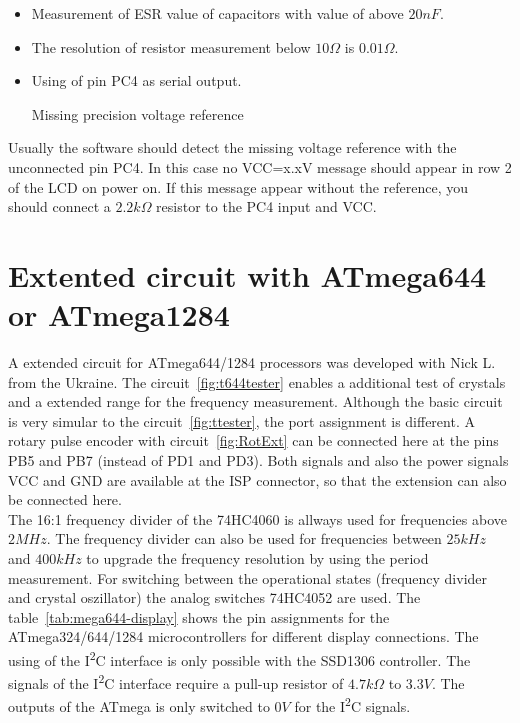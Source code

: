 \begin{description}
\begin{itemize}
 \item Measurement of ESR value of capacitors with value of above  \(20nF\).\\
 \item The resolution of resistor measurement below \(10\Omega\) is \(0.01\Omega\).\\
 \item Using of pin PC4 as serial output.\\
 \item[Missing precision voltage reference]
 \end{itemize}
Usually the software should detect the missing voltage reference with the unconnected pin PC4.
In this case no VCC=x.xV message should appear in row 2 of the LCD on power on.
If this message appear without the reference, you should connect a \(2.2k\Omega\) resistor
to the PC4 input and VCC.

\end{description}


\section{Extented circuit with ATmega644 or ATmega1284}

A extended circuit for ATmega644/1284 processors was developed with Nick L. from the Ukraine.
The circuit~\ref{fig:t644tester} enables a additional test of crystals and a extended range
for the frequency measurement.
Although the basic circuit is very simular to the circuit~\ref{fig:ttester}, the
port assignment is different.
A rotary pulse encoder with circuit~\ref{fig:RotExt} can be connected here at the pins PB5 and PB7 (instead of PD1 and PD3).
Both signals and also the power signals VCC and GND are available at the ISP connector,
so that the extension can also be connected here.\\

The 16:1 frequency divider of the 74HC4060 is allways used for frequencies above \(2MHz\).
The frequency divider can also be used for frequencies between \(25kHz\) and \(400kHz\) to
upgrade the frequency resolution by using the period measurement.
For switching between the operational states (frequency divider and crystal oszillator)
the analog switches 74HC4052 are used.
The table~\ref{tab:mega644-display} shows the pin assignments for the ATmega324/644/1284
microcontrollers for different display connections.
The using of the I\textsuperscript{2}C interface is only possible with the SSD1306 controller.
The signals of the I\textsuperscript{2}C interface require a pull-up resistor of \(4.7k\Omega\) to \(3.3V\).
The outputs of the ATmega is only switched to \(0V\) for the I\textsuperscript{2}C signals.


